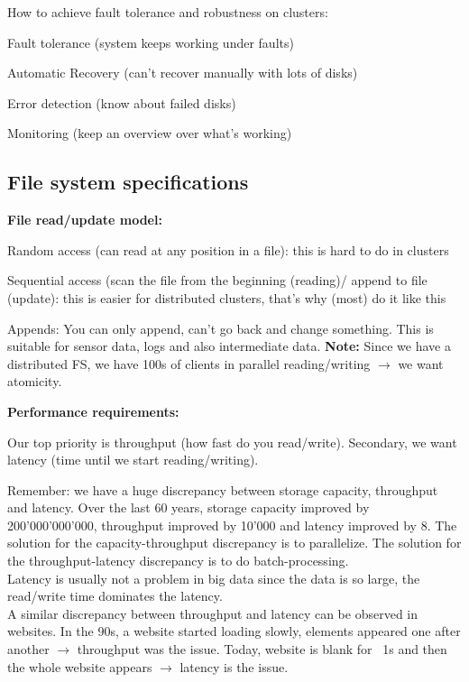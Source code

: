 \documentclass[11pt,oneside,a4paper]{article}
\begin{document}
How to achieve fault tolerance and robustness on clusters:

\begin{compactitem}
	\item Fault tolerance (system keeps working under faults)
	\item Automatic Recovery (can't recover manually with lots of disks)
	\item Error detection (know about failed disks)
	\item Monitoring (keep an overview over what's working)
\end{compactitem}

\subsection{File system specifications}

\textbf{File read/update model:}

\begin{compactitem}
	\item Random access (can read at any position in a file): this is hard to do in clusters
	\item Sequential access (scan the file from the beginning (reading)/ append to file (update): this is easier for distributed clusters, that's why (most) do it like this
\end{compactitem}

Appends: You can only append, can't go back and change something. This is suitable for sensor data, logs and also intermediate data. \textbf{Note:} Since we have a distributed FS, we have 100s of clients in parallel reading/writing $\rightarrow$ we want atomicity.

\textbf{Performance requirements:}

Our top priority is throughput (how fast do you read/write). Secondary, we want latency (time until we start reading/writing).

Remember: we have a huge discrepancy between storage capacity, throughput and latency. Over the last 60 years, storage capacity improved by 200'000'000'000, throughput improved by 10'000 and latency improved by 8. The solution for the capacity-throughput discrepancy is to parallelize. The solution for the throughput-latency discrepancy is to do batch-processing.\\
Latency is usually not a problem in big data since the data is so large, the read/write time dominates the latency.\\
A similar discrepancy between throughput and latency can be observed in websites. In the 90s, a website started loading slowly, elements appeared one after another $\rightarrow$ throughput was the issue. Today, website is blank for ~1s and then the whole website appears $\rightarrow$ latency is the issue.
\end{document}
